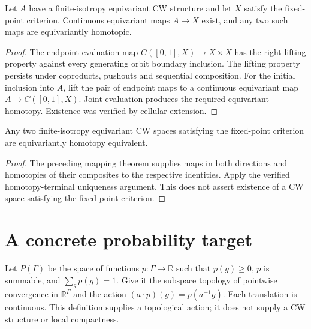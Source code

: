 \begin{proposition}\label{prop:equivariant-cellular-homotopy-terminal}
Let $A$ have a finite-isotropy equivariant CW structure and let $X$ satisfy
the fixed-point criterion. Continuous equivariant maps $A\to X$ exist,
and any two such maps are equivariantly homotopic.
\end{proposition}
\begin{proof}
\leanok
The endpoint evaluation map $C([0,1],X)\to X\times X$ has the right lifting
property against every generating orbit boundary inclusion. The lifting
property persists under coproducts, pushouts and sequential composition.
For the initial inclusion into $A$, lift the pair of endpoint maps to a
continuous equivariant map $A\to C([0,1],X)$. Joint evaluation produces the
required equivariant homotopy. Existence was verified by cellular extension.
\end{proof}

\begin{proposition}\label{prop:cw-fixed-point-uniqueness}
Any two finite-isotropy equivariant CW spaces satisfying the fixed-point
criterion are equivariantly homotopy equivalent.
\end{proposition}
\begin{proof}
\leanok
The preceding mapping theorem supplies maps in both directions and homotopies
of their composites to the respective identities. Apply the verified
homotopy-terminal uniqueness argument. This does not assert existence of a
CW space satisfying the fixed-point criterion.
\end{proof}


\section{A concrete probability target}

\begin{definition}\label{def:probability-simplex}
\leanok
Let $P(\Gamma)$ be the space of functions $p:\Gamma\to\mathbb R$ such that
$p(g)\geq0$, $p$ is summable, and $\sum_g p(g)=1$. Give it the subspace
topology of pointwise convergence in $\mathbb R^\Gamma$ and the action
$(a\cdot p)(g)=p(a^{-1}g)$. Each translation is continuous.
This definition supplies a topological action; it does not supply a CW
structure or local compactness.
\end{definition}

